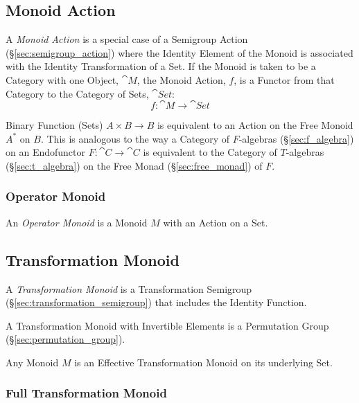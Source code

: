 \subsection{Monoid Action}\label{sec:monoid_action}

A \emph{Monoid Action} is a special case of a Semigroup Action
(\S\ref{sec:semigroup_action}) where the Identity Element of the
Monoid is associated with the Identity Transformation of a Set. If the
Monoid is taken to be a Category with one Object, $\cat{M}$, the
Monoid Action, $f$, is a Functor from that Category to the Category of
Sets, $\cat{Set}$:
\[
  f : \cat{M} \rightarrow \cat{Set}
\]

Binary Function (Sets) $A \times B \rightarrow B$ is equivalent to an
Action on the Free Monoid $A^*$ on $B$. This is analogous to the way a
Category of $F$-algebras (\S\ref{sec:f_algebra}) on an Endofunctor $F
: \cat{C} \rightarrow \cat{C}$ is equivalent to the Category of
$T$-algebras (\S\ref{sec:t_algebra}) on the Free Monad
(\S\ref{sec:free_monad}) of $F$.



\subsubsection{Operator Monoid}\label{sec:operator_monoid}

An \emph{Operator Monoid} is a Monoid $M$ with an Action on a Set.



\subsection{Transformation Monoid}\label{sec:transformation_monoid}

A \emph{Transformation Monoid} is a Transformation Semigroup
(\S\ref{sec:transformation_semigroup}) that includes the Identity
Function.

A Transformation Monoid with Invertible Elements is a Permutation
Group (\S\ref{sec:permutation_group}).

Any Monoid $M$ is an Effective Transformation Monoid on its underlying
Set.



\subsubsection{Full Transformation Monoid}\label{sec:full_transformation}

